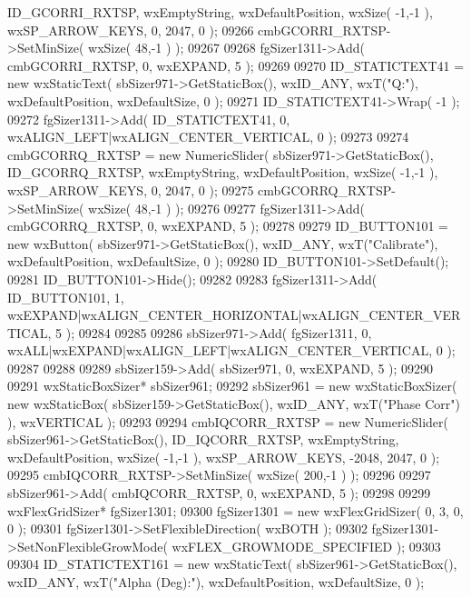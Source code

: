 \begin{DoxyCode}
      ID_GCORRI_RXTSP, wxEmptyString, wxDefaultPosition, wxSize( -1,-1 ), wxSP\_ARROW\_KEYS, 0, 2047, 0 );
09266     cmbGCORRI_RXTSP->SetMinSize( wxSize( 48,-1 ) );
09267     
09268     fgSizer1311->Add( cmbGCORRI_RXTSP, 0, wxEXPAND, 5 );
09269     
09270     ID_STATICTEXT41 = \textcolor{keyword}{new} wxStaticText( sbSizer971->GetStaticBox(), wxID\_ANY, wxT(\textcolor{stringliteral}{"Q:"}), wxDefaultPosition,
       wxDefaultSize, 0 );
09271     ID_STATICTEXT41->Wrap( -1 );
09272     fgSizer1311->Add( ID_STATICTEXT41, 0, wxALIGN\_LEFT|wxALIGN\_CENTER\_VERTICAL, 0 );
09273     
09274     cmbGCORRQ_RXTSP = \textcolor{keyword}{new} NumericSlider( sbSizer971->GetStaticBox(), 
      ID_GCORRQ_RXTSP, wxEmptyString, wxDefaultPosition, wxSize( -1,-1 ), wxSP\_ARROW\_KEYS, 0, 2047, 0 );
09275     cmbGCORRQ_RXTSP->SetMinSize( wxSize( 48,-1 ) );
09276     
09277     fgSizer1311->Add( cmbGCORRQ_RXTSP, 0, wxEXPAND, 5 );
09278     
09279     ID_BUTTON101 = \textcolor{keyword}{new} wxButton( sbSizer971->GetStaticBox(), wxID\_ANY, wxT(\textcolor{stringliteral}{"Calibrate"}), wxDefaultPosition,
       wxDefaultSize, 0 );
09280     ID_BUTTON101->SetDefault(); 
09281     ID_BUTTON101->Hide();
09282     
09283     fgSizer1311->Add( ID_BUTTON101, 1, wxEXPAND|wxALIGN\_CENTER\_HORIZONTAL|wxALIGN\_CENTER\_VERTICAL, 5 );
09284     
09285     
09286     sbSizer971->Add( fgSizer1311, 0, wxALL|wxEXPAND|wxALIGN\_LEFT|wxALIGN\_CENTER\_VERTICAL, 0 );
09287     
09288     
09289     sbSizer159->Add( sbSizer971, 0, wxEXPAND, 5 );
09290     
09291     wxStaticBoxSizer* sbSizer961;
09292     sbSizer961 = \textcolor{keyword}{new} wxStaticBoxSizer( \textcolor{keyword}{new} wxStaticBox( sbSizer159->GetStaticBox(), wxID\_ANY, wxT(\textcolor{stringliteral}{"Phase
       Corr"}) ), wxVERTICAL );
09293     
09294     cmbIQCORR_RXTSP = \textcolor{keyword}{new} NumericSlider( sbSizer961->GetStaticBox(), 
      ID_IQCORR_RXTSP, wxEmptyString, wxDefaultPosition, wxSize( -1,-1 ), wxSP\_ARROW\_KEYS, -2048, 2047, 0 );
09295     cmbIQCORR_RXTSP->SetMinSize( wxSize( 200,-1 ) );
09296     
09297     sbSizer961->Add( cmbIQCORR_RXTSP, 0, wxEXPAND, 5 );
09298     
09299     wxFlexGridSizer* fgSizer1301;
09300     fgSizer1301 = \textcolor{keyword}{new} wxFlexGridSizer( 0, 3, 0, 0 );
09301     fgSizer1301->SetFlexibleDirection( wxBOTH );
09302     fgSizer1301->SetNonFlexibleGrowMode( wxFLEX\_GROWMODE\_SPECIFIED );
09303     
09304     ID_STATICTEXT161 = \textcolor{keyword}{new} wxStaticText( sbSizer961->GetStaticBox(), wxID\_ANY, wxT(\textcolor{stringliteral}{"Alpha (Deg):"}), 
      wxDefaultPosition, wxDefaultSize, 0 );

\end{DoxyCode}
